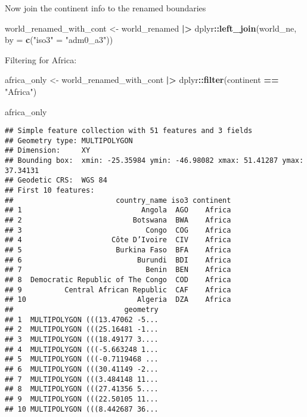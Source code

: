 \documentclass[
]{article}
\newenvironment{Shaded}{\begin{snugshade}}{\end{snugshade}}
\newcommand{\AttributeTok}[1]{\textcolor[rgb]{0.13,0.29,0.53}{#1}}
\newcommand{\FunctionTok}[1]{\textcolor[rgb]{0.13,0.29,0.53}{\textbf{#1}}}
\newcommand{\NormalTok}[1]{#1}
\newcommand{\OtherTok}[1]{\textcolor[rgb]{0.56,0.35,0.01}{#1}}
\newcommand{\SpecialCharTok}[1]{\textcolor[rgb]{0.81,0.36,0.00}{\textbf{#1}}}
\newcommand{\StringTok}[1]{\textcolor[rgb]{0.31,0.60,0.02}{#1}}
\begin{document}
Now join the continent info to the renamed boundaries

\begin{Shaded}
\begin{Highlighting}[]
\NormalTok{world\_renamed\_with\_cont }\OtherTok{\textless{}{-}}\NormalTok{ world\_renamed }\SpecialCharTok{|\textgreater{}} 
\NormalTok{  dplyr}\SpecialCharTok{::}\FunctionTok{left\_join}\NormalTok{(world\_ne, }\AttributeTok{by =} \FunctionTok{c}\NormalTok{(}\StringTok{"iso3"} \OtherTok{=} \StringTok{"adm0\_a3"}\NormalTok{))}
\end{Highlighting}
\end{Shaded}

Filtering for Africa:

\begin{Shaded}
\begin{Highlighting}[]
\NormalTok{africa\_only }\OtherTok{\textless{}{-}}\NormalTok{ world\_renamed\_with\_cont }\SpecialCharTok{|\textgreater{}} 
\NormalTok{  dplyr}\SpecialCharTok{::}\FunctionTok{filter}\NormalTok{(continent }\SpecialCharTok{==} \StringTok{"Africa"}\NormalTok{)}

\NormalTok{africa\_only}
\end{Highlighting}
\end{Shaded}

\begin{verbatim}
## Simple feature collection with 51 features and 3 fields
## Geometry type: MULTIPOLYGON
## Dimension:     XY
## Bounding box:  xmin: -25.35984 ymin: -46.98082 xmax: 51.41287 ymax: 37.34131
## Geodetic CRS:  WGS 84
## First 10 features:
##                        country_name iso3 continent
## 1                            Angola  AGO    Africa
## 2                          Botswana  BWA    Africa
## 3                             Congo  COG    Africa
## 4                     Côte D’Ivoire  CIV    Africa
## 5                      Burkina Faso  BFA    Africa
## 6                           Burundi  BDI    Africa
## 7                             Benin  BEN    Africa
## 8  Democratic Republic of The Congo  COD    Africa
## 9          Central African Republic  CAF    Africa
## 10                          Algeria  DZA    Africa
##                          geometry
## 1  MULTIPOLYGON (((13.47062 -5...
## 2  MULTIPOLYGON (((25.16481 -1...
## 3  MULTIPOLYGON (((18.49177 3....
## 4  MULTIPOLYGON (((-5.663248 1...
## 5  MULTIPOLYGON (((-0.7119468 ...
## 6  MULTIPOLYGON (((30.41149 -2...
## 7  MULTIPOLYGON (((3.484148 11...
## 8  MULTIPOLYGON (((27.41356 5....
## 9  MULTIPOLYGON (((22.50105 11...
## 10 MULTIPOLYGON (((8.442687 36...
\end{verbatim}
\end{document}
